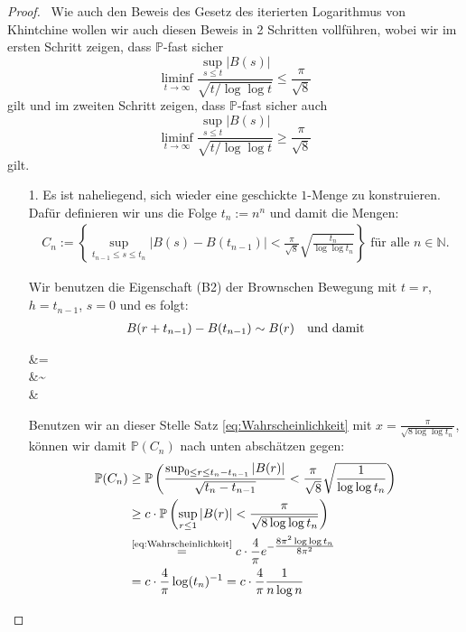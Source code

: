 \documentclass[12pt,a4paper]{scrartcl}
\numberwithin{equation}{section}
\newcommand{\N}{\mathbb{N}} %
\numberwithin{equation}{section}%
\theoremstyle{definition}
\begin{document}
\begin{proof}\
Wie auch den Beweis des Gesetz des iterierten Logarithmus von Khintchine wollen wir auch diesen Beweis in 2 Schritten vollführen, wobei wir im ersten Schritt zeigen, dass $\mathbb{P}$-fast sicher 
\begin{equation*}
\liminf_{t\to\infty} \frac{\sup_{s\leq t}\vert B(s)\vert}{\sqrt{t/\log\log t}} \leq \frac{\pi}{\sqrt{8}}
\end{equation*}
gilt und im zweiten Schritt zeigen, dass $\mathbb{P}$-fast sicher auch
\begin{equation*}
\liminf_{t\to\infty} \frac{\sup_{s\leq t}\vert B(s)\vert}{\sqrt{t/\log\log t}} \geq \frac{\pi}{\sqrt{8}}
\end{equation*}
gilt.
\begin{itemize}
\item[1.] Es ist naheliegend, sich wieder eine geschickte $1$-Menge zu konstruieren. Dafür definieren wir uns die Folge $t_n:=n^n$ und damit die Mengen:
\begin{align*}
C_n:= \left\{ \sup_{t_{n-1}\leq s\leq t_n} \vert B(s)-B(t_{n-1})\vert < \frac{\pi}{\sqrt{8}} \sqrt{\frac{t_n}{\log\log t_n}} \right\} \text{ für alle } n \in \N.
\end{align*}

Wir benutzen die Eigenschaft (B2) der Brownschen Bewegung mit $t=r$, $h=t_{n-1}$, $s=0$ und es folgt:
\begin{align*}
B(r+t_{n-1})-B(t_{n-1}) \sim B(r) \text{\quad und damit}
\end{align*}
\begin{flalign*}
&= \\
&\sim {} {\sqrt{t_n}}\\
&\leq \frac{\sup_{0\leq r \leq t_n-t_{n-1}} \vert B(r) \vert} {}
\end{flalign*}

Benutzen wir an dieser Stelle Satz \ref{eq:Wahrscheinlichkeit} mit $x=\frac{\pi}{\sqrt{8\log\log t_n}}$, können wir damit $\mathbb{P}(C_n)$ nach unten abschätzen gegen:
\begin{align*}
\mathbb{P}(C_n)
&\geq \mathbb{P}\left( \frac{\sup_{0\leq r \leq t_n-t_{n-1}} \vert B(r) \vert} {\sqrt{t_n-t_{n-1}}} < \frac{\pi}{\sqrt{8}} \sqrt{\frac{1}{\log\log t_n}}\right)\\
&\geq c \cdot \mathbb{P} \left( \sup_{r\leq 1} \vert B(r) \vert < \frac{\pi}{\sqrt{8\log\log t_n}} \right)\\
&\overset{\text{\ref{eq:Wahrscheinlichkeit}}}= c \cdot \frac{4}{\pi} e^{-\tfrac{8\pi^2\log\log t_n}{8\pi^2}}\\
&= c\cdot \frac{4}{\pi} \log(t_n)^{-1}
= c\cdot \frac{4}{\pi} \frac{1}{n\log n}
\end{align*}


\end{itemize}
\end{proof}
\end{document}
